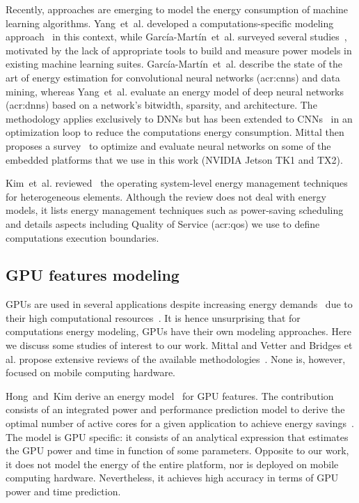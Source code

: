 Recently, approaches are emerging to model the energy consumption of machine learning algorithms.
Yang~et~al. developed a computations-specific modeling approach~\citep{yang2017method} in this context, while Garc{\'i}a-Mart{\'i}n~et~al. surveyed several studies~\citep{garcia2019estimation}, motivated by the lack of appropriate tools to build and measure power models in existing machine learning suites. Garc{\'i}a-Mart{\'i}n~et~al. describe the state of the art of energy estimation for convolutional neural networks (\Gls{acr:cnn}s) and data mining, whereas Yang~et~al. evaluate an energy model of deep neural networks (\Gls{acr:dnn}s) based on a network's bitwidth, sparsity, and architecture. The methodology applies exclusively to DNNs but has been extended to CNNs~\citep{yang2017designing} in an optimization loop to reduce the computations energy consumption. Mittal then proposes a survey~\citep{mittal2019survey} to optimize and evaluate neural networks on some of the embedded platforms that we use in this work (NVIDIA Jetson TK1 and TX2). 

Kim~et~al. reviewed~\citep{kim2018survey} the operating system-level energy management techniques for heterogeneous elements. Although the review does not deal with energy models, it lists energy management techniques such as power-saving scheduling and details aspects including Quality of Service (\Gls{acr:qos}) we use to define computations execution boundaries.

\subsection{GPU features modeling}

GPUs are used in several applications despite increasing energy demands~\citep{mittal2014survey} due to their high computational resources~\citep{kasichayanula2012power}. It is hence unsurprising that for computations energy modeling, GPUs have their own modeling approaches. Here we discuss some studies of interest to our work. Mittal and Vetter and Bridges et al. propose extensive reviews of the available methodologies~\citep{bridges2016understanding,mittal2014survey}. None is, however, focused on mobile computing hardware.

Hong~and~Kim derive an energy model~\citep{hong2010integrated} for GPU features. The contribution consists of an integrated power and performance prediction model to derive the optimal number of active cores for a given application to achieve energy savings~\citep{hong2010integrated}. The model is GPU specific: it consists of an analytical expression that estimates the GPU power and time in function of some parameters. Opposite to our work, it does not model the energy of the entire platform, nor is deployed on mobile computing hardware. Nevertheless, it achieves high accuracy in terms of GPU power and time prediction.

